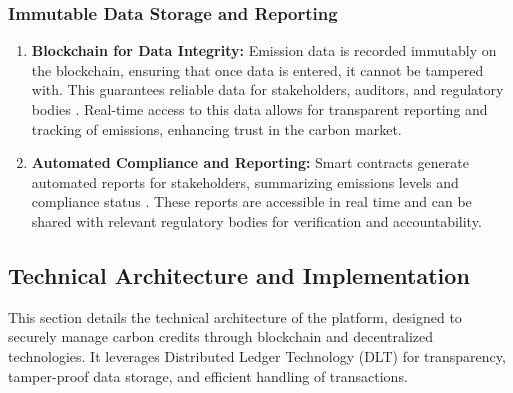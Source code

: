 \documentclass[preprint,12pt]{elsarticle}
\begin{document}
\subsubsection{Immutable Data Storage and Reporting}
\begin{enumerate}
    \item \textbf{Blockchain for Data Integrity:}
Emission data is recorded immutably on the blockchain, ensuring that once data is entered, it cannot be tampered with. This guarantees reliable data for stakeholders, auditors, and regulatory bodies \citep{adams2018blockchain}. Real-time access to this data allows for transparent reporting and tracking of emissions, enhancing trust in the carbon market.
  \item \textbf{Automated Compliance and Reporting:}
Smart contracts generate automated reports for stakeholders, summarizing emissions levels and compliance status \citep{perez2002technological}. These reports are accessible in real time and can be shared with relevant regulatory bodies for verification and accountability.
\end{enumerate}
\subsection{Technical Architecture and Implementation}
This section details the technical architecture of the platform, designed to securely manage carbon credits through blockchain and decentralized technologies. It leverages Distributed Ledger Technology (DLT) for transparency, tamper-proof data storage, and efficient handling of transactions.
\end{document}
